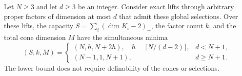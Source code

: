 \begin{theorem}
\label{thm:lp-smooth-frontier}
Let $N\geq3$ and let $d\geq3$ be an integer. Consider exact lifts
through arbitrary proper factors of dimension at most $d$ that admit
these global selections. Over these lifts, the capacity
$S=\sum_i(\dim K_i-2)_+$, the factor count $k$, and the total
cone dimension $M$ have the simultaneous minima
\begin{equation}\label{eq:lp-smooth-frontier}
 (S,k,M)=
 \begin{cases}
 (N,h,N+2h),\quad h=\lceil N/(d-2)\rceil,&d<N+1,\\
 (N-1,1,N+1),&d\geq N+1.
 \end{cases}
\end{equation}
The lower bound does not require definability of the cones or selections.
\end{theorem}
